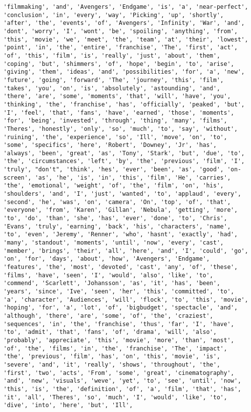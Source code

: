 \documentclass[11pt]{article}
\begin{document}
\begin{Verbatim}[commandchars=\\\{\}]
'filmmaking', 'and', 'Avengers', 'Endgame', 'is', 'a', 'near-perfect', 'conclusion', 'in', 'every', 'way', 'Picking', 'up', 'shortly', 'after', 'the', 'events', 'of', 'Avengers', 'Infinity', 'War', 'and', 'dont', 'worry', 'I', 'wont', 'be', 'spoiling', 'anything', 'from', 'this', 'movie', 'we', 'meet', 'the', 'team', 'at', 'their', 'lowest', 'point', 'in', 'the', 'entire', 'franchise', 'The', 'first', 'act', 'of', 'this', 'film', 'is', 'really', 'just', 'about', 'them', 'coping', 'but', 'shimmers', 'of', 'hope', 'begin', 'to', 'arise', 'giving', 'them', 'ideas', 'and', 'possibilities', 'for', 'a', 'new', 'future', 'going', 'forward', 'The', 'journey', 'this', 'film', 'takes', 'you', 'on', 'is', 'absolutely', 'astounding', 'and', 'there', 'are', 'some', 'moments', 'that', 'will', 'have', 'you', 'thinking', 'the', 'franchise', 'has', 'officially', 'peaked', 'but', 'I', 'feel', 'that', 'fans', 'have', 'earned', 'those', 'moments', 'for', 'being', 'invested', 'through', 'thing', 'many', 'films', 'Theres', 'honestly', 'only', 'so', 'much', 'to', 'say', 'without', 'ruining', 'the', 'experience', 'so', 'Ill', 'move', 'on', 'to', 'some', 'specifics', 'here', 'Robert', 'Downey', 'Jr', 'has', 'always', 'been', 'great', 'as', 'Tony', 'Stark', 'but', 'due', 'to', 'the', 'circumstances', 'left', 'by', 'the', 'previous', 'film', 'I', 'truly', "don't", 'think', 'hes', 'ever', 'been', 'as', 'good', 'on-screen', 'as', 'he', 'is', 'in', 'this', 'film', 'He', 'carries', 'the', 'emotional', 'weight', 'of', 'the', 'film', 'on', 'his', 'shoulders', 'and', 'I', 'just', 'wanted', 'to', 'applaud', 'every', 'second', 'he', 'was', 'on', 'camera', 'On', 'top', 'of', 'that', 'everyone', 'from', 'Karen', 'Gillan', 'Nebula', 'getting', 'more', 'to', 'do', 'than', 'she', 'has', 'ever', 'done', 'to', 'Chris', 'Evans', 'truly', 'earning', 'back', 'his', 'characters', 'name', 'to', 'even', 'Jeremy', 'Renner', 'who', 'hasnt', 'exactly', 'had', 'many', 'standout', 'moments', 'until', 'now', 'every', 'cast', 'member', 'brings', 'their', 'all', 'here', 'and', 'I', 'could', 'go', 'on', 'for', 'days', 'about', 'how', 'Avengers', 'Endgame', 'features', 'the', 'most', 'devoted', 'cast', 'any', 'of', 'these', 'films', 'have', 'seen', 'I', 'would', 'also', 'like', 'to', 'commend', 'Scarlett', 'Johansson', 'as', 'it', 'has', 'been', 'years', 'since', 'Ive', 'seen', 'her', 'this', 'committed', 'to', 'a', 'character', 'Audiences', 'will', 'flock', 'to', 'this', 'movie', 'hoping', 'for', 'a', 'lot', 'of', 'bigbudget', 'spectacle', 'and', 'although', 'there', 'are', 'some', 'of', 'the', 'craziest', 'sequences', 'in', 'the', 'franchise', 'thus', 'far', 'I', 'have', 'to', 'admit', 'that', 'fans', 'of', 'drama', 'will', 'also', 'probably', 'appreciate', 'this', 'movie', 'more', 'than', 'most', 'of', 'the', 'films', 'in', 'the', 'franchise', 'The', 'impact', 'the', 'previous', 'film', 'has', 'on', 'this', 'movie', 'is', 'severe', 'and', 'it', 'really', 'shows', 'throughout', 'the', 'first', 'two', 'acts', 'From', 'some', 'great', 'cinematography', 'and', 'new', 'visuals', 'weve', 'yet', 'to', 'see', 'until', 'now', 'this', 'is', 'the', 'definition', 'of', 'a', 'film', 'that', 'has', 'it', 'all', 'Theres', 'so', 'much', 'I', 'would', 'like', 'to', 'dive', 'into', 'here', 'but', 'Ill', 
\end{Verbatim}
\end{document}
